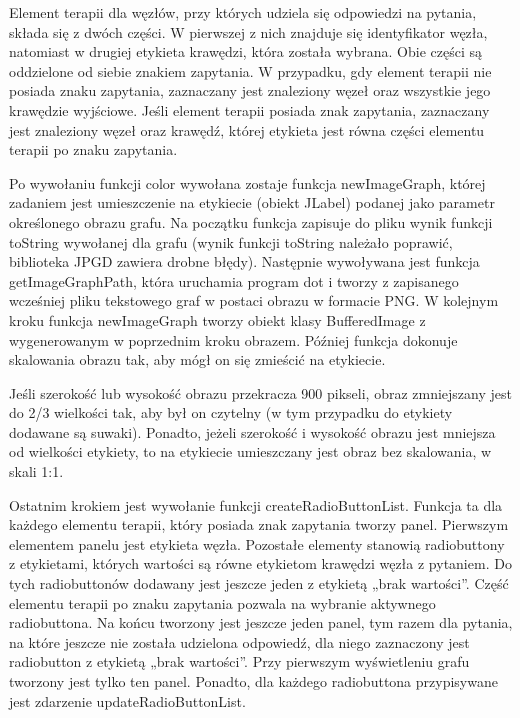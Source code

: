 Element terapii dla węzłów, przy których udziela się odpowiedzi na pytania, składa się z dwóch części. W pierwszej z nich znajduje się identyfikator węzła, natomiast w drugiej etykieta krawędzi, która została wybrana. Obie części są oddzielone od siebie znakiem zapytania. W przypadku, gdy element terapii nie posiada znaku zapytania, zaznaczany jest znaleziony węzeł oraz wszystkie jego krawędzie wyjściowe.  Jeśli element terapii posiada znak zapytania, zaznaczany jest znaleziony węzeł oraz krawędź, której etykieta jest równa części elementu terapii po znaku zapytania.
 
Po wywołaniu funkcji color wywołana zostaje funkcja newImageGraph, której zadaniem jest umieszczenie na etykiecie (obiekt JLabel) podanej jako parametr określonego obrazu grafu. Na początku funkcja zapisuje do pliku wynik funkcji toString wywołanej dla grafu (wynik funkcji toString należało poprawić, biblioteka JPGD zawiera drobne błędy). Następnie wywoływana jest funkcja getImageGraphPath, która uruchamia program dot i tworzy z zapisanego wcześniej pliku tekstowego graf w postaci obrazu w formacie PNG. W kolejnym kroku funkcja newImageGraph tworzy obiekt klasy BufferedImage z wygenerowanym w poprzednim kroku obrazem. Później funkcja dokonuje skalowania obrazu tak, aby mógł on się zmieścić na etykiecie. 

Jeśli szerokość lub wysokość obrazu przekracza 900 pikseli, obraz zmniejszany jest do 2/3 wielkości tak, aby był on czytelny (w tym przypadku do etykiety dodawane są suwaki). Ponadto, jeżeli szerokość i wysokość obrazu jest mniejsza od wielkości etykiety, to na etykiecie umieszczany jest obraz bez skalowania, w skali 1:1.
 
Ostatnim krokiem jest wywołanie funkcji createRadioButtonList. Funkcja ta dla każdego elementu terapii, który posiada znak zapytania tworzy panel. Pierwszym elementem panelu jest etykieta węzła. 
Pozostałe elementy stanowią radiobuttony z etykietami, których wartości są równe etykietom krawędzi węzła z pytaniem. 
Do tych radiobuttonów dodawany jest jeszcze jeden z etykietą „brak wartości”. Część elementu terapii po znaku zapytania pozwala na wybranie aktywnego radiobuttona. 
Na końcu tworzony jest jeszcze jeden panel, tym razem dla pytania, na które jeszcze nie została udzielona odpowiedź, dla niego zaznaczony jest radiobutton z etykietą „brak wartości”. Przy pierwszym wyświetleniu grafu tworzony jest tylko ten panel. Ponadto, dla każdego radiobuttona przypisywane jest zdarzenie updateRadioButtonList.
 
